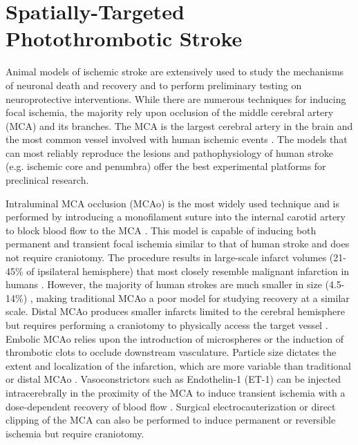 
\chapter{Spatially-Targeted Photothrombotic Stroke} \label{Chapter_3}

Animal models of ischemic stroke are extensively used to study the mechanisms of neuronal death and recovery and to perform preliminary testing on neuroprotective interventions. While there are numerous techniques for inducing focal ischemia, the majority rely upon occlusion of the middle cerebral artery (MCA) and its branches. The MCA is the largest cerebral artery in the brain and the most common vessel involved with human ischemic events \cite{Sicard:2009ku}. The models that can most reliably reproduce the lesions and pathophysiology of human stroke (e.g. ischemic core and penumbra) offer the best experimental platforms for preclinical research.

Intraluminal MCA occlusion (MCAo) is the most widely used technique and is performed by introducing a monofilament suture into the internal carotid artery to block blood flow to the MCA \cite{Kozuimi:1986bd}. This model is capable of inducing both permanent and transient focal ischemia similar to that of human stroke and does not require craniotomy. The procedure results in large-scale infarct volumes (21-45\% of ipsilateral hemisphere) that most closely resemble malignant infarction in humans \cite{Carmichael:2005gk}. However, the majority of human strokes are much smaller in size (4.5-14\%) \cite{Carmichael:2005gk, Brott:1989bl}, making traditional MCAo a poor model for studying recovery at a similar scale. Distal MCAo produces smaller infarcts limited to the cerebral hemisphere but requires performing a craniotomy to physically access the target vessel \cite{Doyle:2014bz}. Embolic MCAo relies upon the introduction of microspheres or the induction of thrombotic clots to occlude downstream vasculature. Particle size dictates the extent and localization of the infarction, which are more variable than traditional or distal MCAo \cite{Carmichael:2005gk}. Vasoconstrictors such as Endothelin-1 (ET-1) can be injected intracerebrally in the proximity of the MCA to induce transient ischemia with a dose-dependent recovery of blood flow \cite{Sicard:2009ku}. Surgical electrocauterization or direct clipping of the MCA can also be performed to induce permanent or reversible ischemia but require craniotomy.

